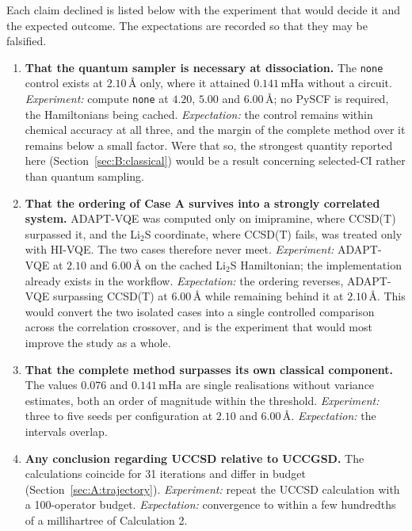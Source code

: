 \documentclass[11pt,a4paper]{article}
\newcommand{\mHa}{\ensuremath{\,\mathrm{mHa}}}
\newcommand{\Ang}{\ensuremath{\,\text{\AA}}}
\newcommand{\code}[1]{\texttt{\small #1}}
\newcommand{\LiS}{\texorpdfstring{Li$_2$S}{Li2S}}
\begin{document}
Each claim declined is listed below with the experiment that would decide it
and the expected outcome. The expectations are recorded so that they may be
falsified.

\begin{enumerate}[leftmargin=1.5em,itemsep=6pt]

\item \textbf{That the quantum sampler is necessary at dissociation.}
The \code{none} control exists at $2.10\Ang$ only, where it attained
$0.141\mHa$ without a circuit. \emph{Experiment:} compute \code{none} at
$4.20$, $5.00$ and $6.00\Ang$; no PySCF is required, the Hamiltonians being
cached. \emph{Expectation:} the control remains within chemical accuracy at all
three, and the margin of the complete method over it remains below a small
factor. Were that so, the strongest quantity reported here
(Section~\ref{sec:B:classical}) would be a result concerning selected-CI rather
than quantum sampling.

\item \textbf{That the ordering of Case A survives into a strongly correlated
system.} ADAPT-VQE was computed only on imipramine, where CCSD(T) surpassed it,
and the \LiS{} coordinate, where CCSD(T) fails, was treated only with HI-VQE.
The two cases therefore never meet. \emph{Experiment:} ADAPT-VQE at $2.10$ and
$6.00\Ang$ on the cached \LiS{} Hamiltonian; the implementation already exists
in the workflow. \emph{Expectation:} the ordering reverses, ADAPT-VQE
surpassing CCSD(T) at $6.00\Ang$ while remaining behind it at $2.10\Ang$. This
would convert the two isolated cases into a single controlled comparison across
the correlation crossover, and is the experiment that would most improve the
study as a whole.

\item \textbf{That the complete method surpasses its own classical component.}
The values $0.076$ and $0.141\mHa$ are single realisations without variance
estimates, both an order of magnitude within the threshold.
\emph{Experiment:} three to five seeds per configuration at $2.10$ and
$6.00\Ang$. \emph{Expectation:} the intervals overlap.

\item \textbf{Any conclusion regarding UCCSD relative to UCCGSD.}
The calculations coincide for 31 iterations and differ in budget
(Section~\ref{sec:A:trajectory}). \emph{Experiment:} repeat the UCCSD
calculation with a 100-operator budget. \emph{Expectation:} convergence to
within a few hundredths of a millihartree of Calculation 2.


\end{enumerate}
\end{document}
